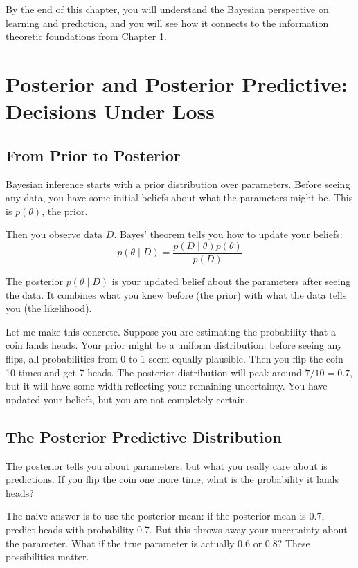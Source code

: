 By the end of this chapter, you will understand the Bayesian perspective on learning and prediction, and you will see how it connects to the information theoretic foundations from Chapter 1.

\vspace{2em}

\section{Posterior and Posterior Predictive: Decisions Under Loss}

\subsection{From Prior to Posterior}

Bayesian inference starts with a prior distribution over parameters. Before seeing any data, you have some initial beliefs about what the parameters might be. This is $p(\theta)$, the prior.

Then you observe data $D$. Bayes' theorem tells you how to update your beliefs:
\begin{equation}
p(\theta \mid D) = \frac{p(D \mid \theta) p(\theta)}{p(D)}
\end{equation}

The posterior $p(\theta \mid D)$ is your updated belief about the parameters after seeing the data. It combines what you knew before (the prior) with what the data tells you (the likelihood).

Let me make this concrete. Suppose you are estimating the probability that a coin lands heads. Your prior might be a uniform distribution: before seeing any flips, all probabilities from 0 to 1 seem equally plausible. Then you flip the coin 10 times and get 7 heads. The posterior distribution will peak around $7/10 = 0.7$, but it will have some width reflecting your remaining uncertainty. You have updated your beliefs, but you are not completely certain.

\subsection{The Posterior Predictive Distribution}

The posterior tells you about parameters, but what you really care about is predictions. If you flip the coin one more time, what is the probability it lands heads?

The naive answer is to use the posterior mean: if the posterior mean is 0.7, predict heads with probability 0.7. But this throws away your uncertainty about the parameter. What if the true parameter is actually 0.6 or 0.8? These possibilities matter.

